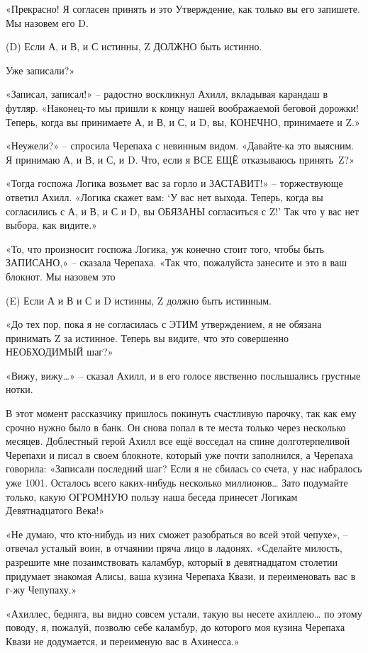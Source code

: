 \documentclass[../main.tex]{subfiles}
\begin{document}
\begin{Dialogue}
«Прекрасно! Я согласен принять и это Утверждение, как только вы его запишете. Мы назовем его D.

\begin{statements}
    \item[(D)] Если А, и В, и С истинны, Z ДОЛЖНО быть истинно.
\end{statements}

Уже записали?»

«Записал, записал!» \--- радостно воскликнул Ахилл, вкладывая карандаш в футляр. «Наконец-то мы пришли к концу нашей воображаемой беговой дорожки! Теперь, когда вы принимаете А, и В, и С, и D, вы, КОНЕЧНО, принимаете и Z.»

«Неужели?» \--- спросила Черепаха с невинным видом. «Давайте-ка это выясним. Я принимаю А, и В, и С, и D. Что, если я ВСЕ ЕЩЁ отказываюсь принять~Z?»

«Тогда госпожа Логика возьмет вас за горло и ЗАСТАВИТ!» \--- торжествующе ответил Ахилл. «Логика скажет вам: \enquote*{У вас нет выхода. Теперь, когда вы согласились с А, и В, и С и D, вы ОБЯЗАНЫ согласиться с Z!} Так что у вас нет выбора, как видите.»

«То, что произносит госпожа Логика, уж конечно стоит того, чтобы быть ЗАПИСАНО,» \--- сказала Черепаха. «Так что, пожалуйста занесите и это в ваш блокнот. Мы назовем это

\begin{statements}
    \item[(E)] Если А и В и С и D истинны, Z должно быть истинным.
\end{statements}

«До тех пор, пока я не согласилась с ЭТИМ утверждением, я не обязана принимать Z за истинное. Теперь вы видите, что это совершенно НЕОБХОДИМЫЙ шаг?»

«Вижу, вижу\ldots» \--- сказал Ахилл, и в его голосе явственно послышались грустные нотки.

В этот момент рассказчику пришлось покинуть счастливую парочку, так как ему срочно нужно было в банк. Он снова попал в те места только через несколько месяцев. Доблестный герой Ахилл все ещё восседал на спине долготерпеливой Черепахи и писал в своем блокноте, который уже почти заполнился, а Черепаха говорила: «Записали последний шаг? Если я не сбилась со счета, у нас набралось уже 1001. Осталось всего каких-нибудь несколько миллионов\ldots{} Зато подумайте только, какую ОГРОМНУЮ пользу наша беседа принесет Логикам Девятнадцатого Века!»

«Не думаю, что кто-нибудь из них сможет разобраться во всей этой чепухе», \--- отвечал усталый воин, в отчаянии пряча лицо в ладонях. «Сделайте милость, разрешите мне позаимствовать каламбур, который в девятнадцатом столетии придумает знакомая Алисы, ваша кузина Черепаха Квази, и переименовать вас в г-жу Чепупаху.»

«Ахиллес, бедняга, вы видно совсем устали, такую вы несете ахиллею\ldots{} по этому поводу, я, пожалуй, позволю себе каламбур, до которого моя кузина Черепаха Квази не додумается, и переименую вас в Ахинесса.»

\end{Dialogue}
\end{document}
